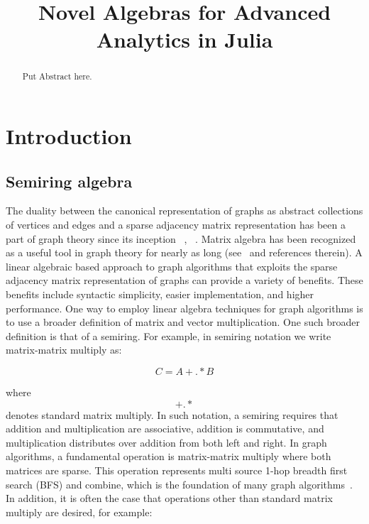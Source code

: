 \documentclass[conference]{IEEEtran}
\begin{document}
\title{Novel Algebras for Advanced Analytics in Julia}

\author{
}

\maketitle

\begin{abstract}
Put Abstract here.
\end{abstract}

\section{Introduction}

\subsection{Semiring algebra}

The duality between the canonical representation of graphs as abstract
collections of vertices and edges and a sparse adjacency matrix
representation has been a part of graph theory since its inception
~\cite{Konig1931}, ~\cite{Konig1936}. Matrix algebra has been
recognized as a useful tool in graph theory for nearly as long
(see~\cite{Harary1969} and references therein).  A linear algebraic
based approach to graph algorithms that exploits the sparse adjacency
matrix representation of graphs can provide a variety of
benefits. These benefits include syntactic simplicity, easier
implementation, and higher performance.  One way to employ linear
algebra techniques for graph algorithms is to use a broader definition
of matrix and vector multiplication. One such broader definition is
that of a semiring.  For example, in semiring notation we write
matrix-matrix multiply as:

$$C = A +.* B$$

where $$+.*$$ denotes standard matrix multiply.  In such notation, a
semiring requires that addition and multiplication are associative,
addition is commutative, and multiplication distributes over addition
from both left and right.  In graph algorithms, a fundamental
operation is matrix-matrix multiply where both matrices are sparse.
This operation represents multi source 1-hop breadth first search
(BFS) and combine, which is the foundation of many graph
algorithms~\cite{shahgilbert}.  In addition, it is often the case that
operations other than standard matrix multiply are desired, for
example:
\end{document}
